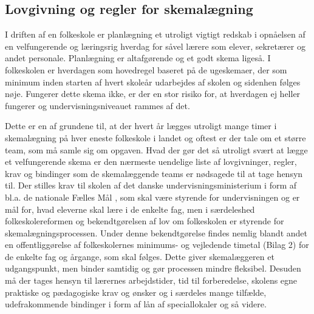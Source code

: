 \subsection{Lovgivning og regler for skemalægning}
\label{Lovgivning og regler}
I driften af en folkeskole er planlægning et utroligt vigtigt redskab i opnåelsen af en velfungerende og læringsrig hverdag for såvel lærere som elever, sekretærer og andet personale. Planlægning er altafgørende og et godt skema ligeså. I folkeskolen er hverdagen som hovedregel baseret på de ugeskemaer, der som minimum inden starten af hvert skoleår udarbejdes af skolen og sidenhen følges nøje. Fungerer dette skema ikke, er der en stor risiko for, at hverdagen ej heller fungerer og undervisningsniveauet rammes af det.

Dette er en af grundene til, at der hvert år lægges utroligt mange timer i skemalægning på hver eneste folkeskole i landet og oftest er der tale om et større team, som må samle sig om opgaven. Hvad der gør det så utroligt svært at lægge et velfungerende skema er den nærmeste uendelige liste af lovgivninger, regler, krav og bindinger som de skemalæggende teams er nødsagede til at tage hensyn til.  Der stilles krav til skolen af det danske undervisningsministerium i form af bl.a. de nationale Fælles Mål \cite{fmaal}, som skal være styrende for undervisningen og er mål for, hvad eleverne skal lære i de enkelte fag, men i særdeleshed folkeskolereformen og bekendtgørelsen af lov om folkeskolen \cite{Lovgivning} er styrende for skemalægningsprocessen. Under denne bekendtgørelse findes nemlig blandt andet en offentliggørelse af folkeskolernes minimums- og vejledende timetal (Bilag 2) for de enkelte fag og årgange, som skal følges. Dette giver skemalæggeren et udgangspunkt, men binder samtidig og gør processen mindre fleksibel. Desuden må der tages hensyn til lærernes arbejdstider, tid til forberedelse, skolens egne praktiske og pædagogiske krav og ønsker og i særdeles mange tilfælde, udefrakommende bindinger i form af lån af speciallokaler og så videre.

